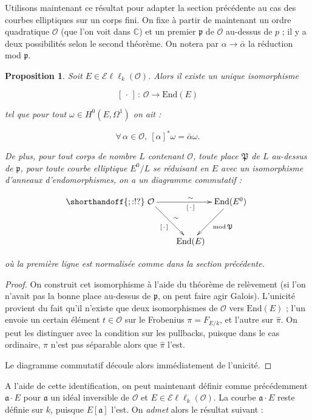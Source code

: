\documentclass[11pt,a4paper]{article}
\newcommand{\C}{\mathbb{C}}
\renewcommand{\O}{\mathcal{O}}
\newcommand{\vers}{\rightarrow}
\newcommand{\End}{\mathrm{End}}
\newcommand{\Ell}{\mathcal{E}\ell\ell}
\renewcommand{\frak}{\mathfrak}
\newcommand{\de}{\,:\,}
\newtheorem{prop}[thm]{Proposition}
\theoremstyle{definition}
\begin{document}
Utilisons maintenant ce résultat pour adapter la section précédente au cas des courbes elliptiques sur un corps fini. On fixe à partir de maintenant un ordre quadratique $\O$ (que l'on voit dans $\C$) et un premier $\frak p$ de $\O$ au-dessus de $p$ ; il y a deux possibilités selon le second théorème. On notera par $\alpha\vers\bar{\alpha}$ la réduction mod $\frak p$.


\begin{prop}

Soit $E\in \Ell_k(\O)$. Alors il existe un unique isomorphisme

$$[\,\cdot\,] \de \O \vers \End(E)$$

tel que pour tout $\omega \in H^0(E,\Omega^1)$ on ait :

$$\forall \, \alpha \in \O,\ [\alpha]^* \omega = \bar{\alpha}\omega.$$

De plus, pour tout corps de nombre $L$ contenant $\O$, toute place $\frak P$ de $L$ au-dessus de $\frak p$, pour toute courbe elliptique $E^0/L$ se réduisant en $E$ avec un isomorphisme d'anneaux d'endomorphismes, on a un diagramme commutatif :

$$
\shorthandoff{;:!?}
\xymatrix @!=8mm {
\O \ar[rr]^\sim_{[\,\cdot\,]} \ar[rd]^\sim_{[\,\cdot\,]} & & \End(E^0) \ar[ld]^{\mathrm{mod}\,\frak P} \\
 & \End(E) & 
}
$$

où la première ligne est normalisée comme dans la section précédente.

\end{prop}

\begin{proof}

On construit cet isomorphisme à l'aide du théorème de relèvement (si l'on n'avait pas la bonne place au-dessus de $\frak p$, on peut faire agir Galois). L'unicité provient du fait qu'il n'existe que deux isomorphismes de $\O$ vers $\End(E)$ ; l'un envoie un certain élément $t\in \O$ sur le Frobenius $\pi = F_{E/k}$, et l'autre sur $\widehat{\pi}.$ On peut les distinguer avec la condition sur les pullbacks, puisque dans le cas ordinaire, $\pi$ n'est pas séparable alors que $\widehat{\pi}$ l'est.

Le diagramme commutatif découle alors immédiatement de l'unicité.
\end{proof}

A l'aide de cette identification, on peut maintenant définir comme précédemment $\frak a\cdot E$ pour $\frak a$ un idéal inversible de $\O$ et $E\in \Ell_k(\O)$. La courbe $\frak a\cdot E$ reste définie sur $k$, puisque $E[\frak a]$ l'est. On \emph{admet} alors le résultat suivant :
\end{document}
